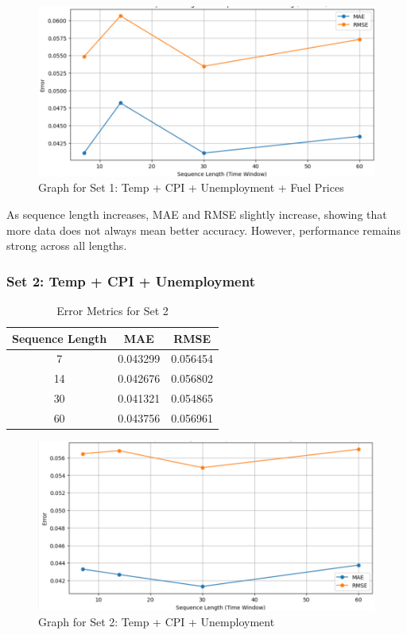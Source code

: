 \documentclass[conference]{IEEEtran}
\begin{document}
\begin{figure}[H]
\centering
\includegraphics[width=0.95\linewidth]{set1.png}
\caption{Graph for Set 1: Temp + CPI + Unemployment + Fuel Prices}
\label{fig:set1}
\end{figure}

As sequence length increases, MAE and RMSE slightly increase, showing that more data does not always mean better accuracy. However, performance remains strong across all lengths.

\subsubsection{Set 2: Temp + CPI + Unemployment}

\begin{table}[htbp]
\centering
\begin{tabular}{|c|c|c|}
\hline
Sequence Length & MAE & RMSE \\
\hline
7 & 0.043299 & 0.056454 \\
14 & 0.042676 & 0.056802 \\
30 & 0.041321 & 0.054865 \\
60 & 0.043756 & 0.056961 \\
\hline
\end{tabular}
\caption{Error Metrics for Set 2}
\label{tab:set2}
\end{table}

\begin{figure}[H]
\centering
\includegraphics[width=0.95\linewidth]{set2.png}
\caption{Graph for Set 2: Temp + CPI + Unemployment}
\label{fig:set2}
\end{figure}
\end{document}
